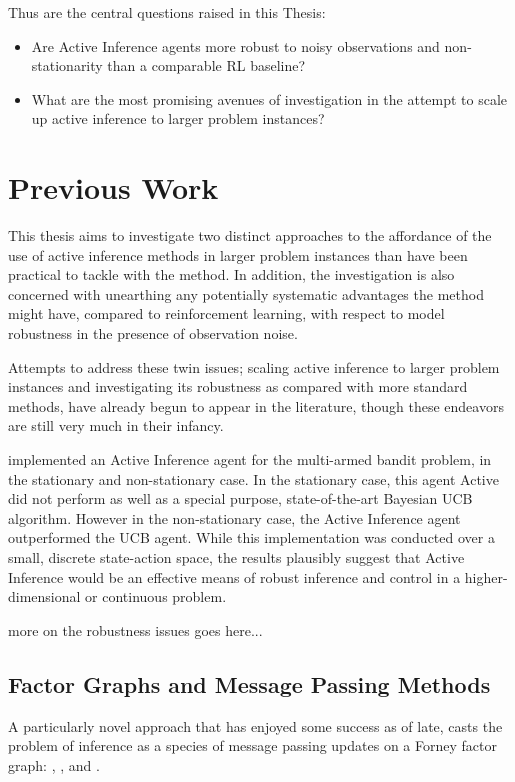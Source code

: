 \documentclass[onecolumn]{IEEEtran}
\begin{document}
Thus are the central questions raised in this Thesis:

\begin{itemize}
\item Are Active Inference agents more robust to noisy observations and non-stationarity than a comparable RL baseline?
\item What are the most promising avenues of investigation in the attempt to scale up active inference to larger problem instances? 
\end{itemize} 

\section{Previous Work}

This thesis aims to investigate two distinct approaches to the affordance of the use of active inference methods in larger problem instances than have been practical to tackle with the method. In addition, the investigation is also concerned with unearthing any potentially systematic advantages the method might have, compared to reinforcement learning, with respect to model robustness in the presence of observation noise.

Attempts to address these twin issues; scaling active inference to larger problem instances and investigating its robustness as compared with more standard methods, have already begun to appear in the literature, though these endeavors are still very much in their infancy. 

\textcite{Emperical-Eval-AIF-Multi-Arm-Bandits} implemented an Active Inference agent for the multi-armed bandit problem, in the stationary and non-stationary case. In the stationary case, this agent Active did not perform as well as a special purpose, state-of-the-art Bayesian UCB algorithm. However in the non-stationary case, the Active Inference agent outperformed the UCB agent. While this implementation was conducted over a small, discrete state-action space, the results plausibly suggest that Active Inference would be an effective means of robust inference and control in a higher-dimensional or continuous problem.  

more on the robustness issues goes here...

\subsection{Factor Graphs and Message Passing Methods}

A particularly novel approach that has enjoyed some success as of late, casts the problem of inference as a species of message passing updates on a Forney factor graph: \textcite{Factor-Graph-Approach-Automated-Design-Bayesian-Algos}, \textcite{Simulating-AIF-By-Message-Passing}, \textcite{Factor-Graph-Desc-Deep-Temp-AIF} and \textcite{Reactive-MP}. 
\end{document}
